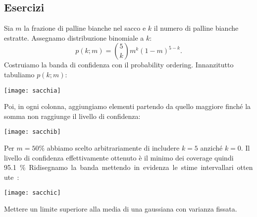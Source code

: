 
\subsection{Esercizi}


\begin{solution*}
	Sia $m$ la frazione di palline bianche nel sacco
	e $k$ il numero di palline bianche estratte.
	Assegnamo distribuzione binomiale a $k$:
	\begin{equation*}
		p(k;m)
		= \binom 5k m^k (1-m)^{5-k}.
	\end{equation*}
	Costruiamo la banda di confidenza con il probability ordering.
	Innanzitutto tabuliamo $p(k;m)$:
	\begin{center}
		\texttt{[image: sacchia]}
	\end{center}
	Poi, in ogni colonna,
	aggiungiamo elementi partendo da quello maggiore finché la somma non raggiunge
	il livello di confidenza:
	\begin{center}
		\texttt{[image: sacchib]}
	\end{center}
	Per $m=\SI{50}\%$ abbiamo scelto arbitrariamente di includere $k=5$ anziché $k=0$.
	Il livello di confidenza effettivamente ottenuto è il minimo dei coverage quindi \SI{95.1}\%.
	Ridisegnamo la banda mettendo in evidenza le stime intervallari ottenute:
	\begin{center}
		\texttt{[image: sacchic]}
	\end{center}
\end{solution*}

\begin{exercise}
	\label{th:gausssup}
	Mettere un limite superiore alla media di una gaussiana con varianza fissata.
\end{exercise}

